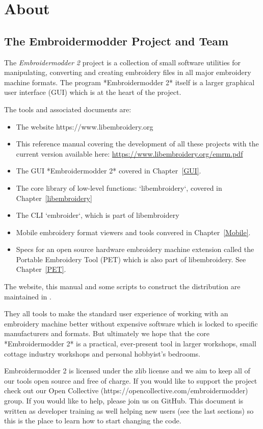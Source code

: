 \documentclass[10pt]{report}
\begin{document}
\section{About}

\subsection{The Embroidermodder Project and Team}

The \emph{Embroidermodder 2} project is a collection of small software
utilities for manipulating, converting and creating embroidery files in all
major embroidery machine formats. The program *Embroidermodder 2* itself
is a larger graphical user interface (GUI) which is at the heart of the project.

The tools and associated documents are:

\begin{itemize}
\item The website https://www.libembroidery.org
\item This reference manual covering the development of all these projects with the current version available here: \url{https://www.libembroidery.org/emrm.pdf}
\item The GUI *Embroidermodder 2* covered in Chapter~\ref{GUI}.
\item The core library of low-level functions: `libembroidery`, covered in Chapter~\ref{libembroidery}
\item The CLI `embroider`, which is part of libembroidery
\item Mobile embroidery format viewers and tools convered in Chapter~\ref{Mobile}.
\item Specs for an open source hardware embroidery machine extension called the Portable Embroidery Tool (PET) which is also part of libembroidery. See Chapter~\ref{PET}.
\end{itemize}

The website, this manual and some scripts to construct the distribution are
maintained in \citep{thewebsite}.

They all tools to make the standard
user experience of working with an embroidery machine better without expensive
software which is locked to specific manufacturers and formats. But ultimately
we hope that the core *Embroidermodder 2* is a practical, ever-present tool in
larger workshops, small cottage industry workshops and personal hobbyist's
bedrooms.

Embroidermodder 2 is licensed under the zlib license and we aim to keep all of our tools open
source and free of charge. If you would like to support the project check out our  Open
Collective (https://opencollective.com/embroidermodder) group.
If you would like to help,
please join us on GitHub. This document is written as developer training as well helping new
users (see the last sections) so this is the place to learn how to start changing the code.
\end{document}
